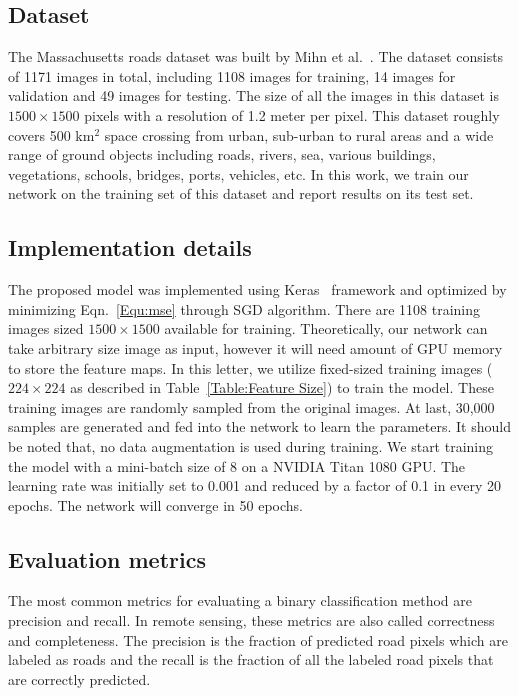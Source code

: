 \documentclass[journal]{IEEEtran}
\begin{document}
\vspace{-0.2cm}
\subsection{Dataset}
The Massachusetts roads dataset was built by Mihn et al.~\cite{mnih2010learning}. The dataset consists of 1171 images in total, including 1108 images for training, 14 images for validation and 49 images for testing. The size of all the images in this dataset is $1500\times1500$ pixels with a resolution of 1.2 meter per pixel. This dataset roughly covers 500 km$^2$ space crossing from urban, sub-urban to rural areas and a wide range of ground objects including roads, rivers, sea, various buildings, vegetations, schools, bridges, ports, vehicles, etc. In this work, we train our network on the training set of this dataset and report results on its test set.


\subsection{Implementation details}
The proposed model was implemented using Keras~\cite{chollet2015keras} framework and optimized by minimizing Eqn.~\ref{Equ:mse} through SGD algorithm. There are 1108 training images sized $1500\times1500$ available for training. Theoretically, our network can take arbitrary size image as input, however it will need amount of GPU memory to store the feature maps. In this letter, we utilize fixed-sized training images ($224\times224$ as described in Table~\ref{Table:Feature Size}) to train the model. These training images are randomly sampled from the original images. At last, 30,000 samples are generated and fed into the network to learn the parameters. It should be noted that, no data augmentation is used during training. We start training the model with a mini-batch size of 8 on a NVIDIA Titan 1080 GPU. The learning rate was initially set to 0.001 and reduced by a factor of 0.1 in every 20 epochs. The network will converge in 50 epochs. 
\subsection{Evaluation metrics}
The most common metrics for evaluating a binary classification method are precision and recall. In remote sensing, these metrics are also called correctness and completeness. The precision is the fraction of predicted road pixels which are labeled as roads and the recall is the fraction of all the labeled road pixels that are correctly predicted.
\end{document}

